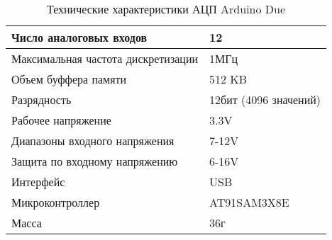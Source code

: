 \documentclass[../main.tex]{subfiles}
\begin{document}
\begin{table}[H]
\centering
\caption{Технические характеристики АЦП Arduino Due}

\begin{tabular}{|l|l|}
                                                                      \hline
Число аналоговых входов            & 12                            \\ \hline
Максимальная частота дискретизации & 1МГц                          \\ \hline
Объем буффера памяти               & 512 KB					               \\ \hline
Разрядность                        & 12бит (4096 значений)         \\ \hline
Рабочее напряжение                 & 3.3V                          \\ \hline
Диапазоны входного напряжения      & 7-12V                         \\ \hline
Защита по входному напряжению      & 6-16V                         \\ \hline
Интерфейс                          & USB                           \\ \hline
Микроконтроллер                    & AT91SAM3X8E                   \\ \hline
Масса                              & 36г                           \\ \hline
\end{tabular}
\end{table}

\newpage
\end{document}
